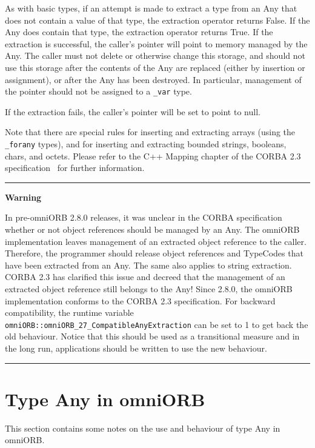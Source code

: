 \documentclass[11pt,twoside,a4paper]{book}
\newcommand{\type}[1]{\texttt{#1}}
\newcommand{\code}[1]{\texttt{#1}}
\newenvironment{statement}%
 {\noindent\begin{minipage}{\textwidth}%
  \vspace{.5\baselineskip}%
  \noindent\rule{\textwidth}{2pt}%
  \vspace{.25\baselineskip}%
  \begin{list}{}{\setlength{\listparindent}{0em}%
                 \setlength{\itemindent}{0em}%
                 \setlength{\leftmargin}{1.5em}%
                 \setlength{\rightmargin}{\leftmargin}%
                 \setlength{\topsep}{0pt}%
                 \setlength{\partopsep}{0pt}}
  \item\relax}
 {\end{list}%
  \vspace{-.25\baselineskip}%
  \noindent\rule{\textwidth}{2pt}%
  \vspace{.5\baselineskip}%
  \end{minipage}}
\begin{document}
As with basic types, if an attempt is made to extract a type from an
Any that does not contain a value of that type, the extraction
operator returns False. If the Any does contain that type, the
extraction operator returns True. If the extraction is successful, the
caller's pointer will point to memory managed by the Any. The caller
must not delete or otherwise change this storage, and should not use
this storage after the contents of the Any are replaced (either by
insertion or assignment), or after the Any has been destroyed. In
particular, management of the pointer should not be assigned to a
\type{\_var} type.

If the extraction fails, the caller's pointer will be set to point to
null.

Note that there are special rules for inserting and extracting arrays
(using the \type{\_forany} types), and for inserting and extracting
bounded strings, booleans, chars, and octets. Please refer to the C++
Mapping chapter of the CORBA 2.3 specification~\cite{corba23-spec} for
further information.


\begin{statement}
\centerline{\textbf{Warning}}

In pre-omniORB 2.8.0 releases, it was unclear in the CORBA
specification whether or not object references should be managed by an
Any.  The omniORB implementation leaves management of an extracted
object reference to the caller. Therefore, the programmer should
release object references and TypeCodes that have been extracted from
an Any. The same also applies to string extraction. CORBA 2.3 has
clarified this issue and decreed that the management of an extracted
object reference still belongs to the Any!  Since 2.8.0, the omniORB
implementation conforms to the CORBA 2.3 specification. For backward
compatibility, the runtime variable
\code{omniORB::omniORB\_27\_CompatibleAnyExtraction} can be set to 1
to get back the old behaviour. Notice that this should be used as a
transitional measure and in the long run, applications should be
written to use the new behaviour.

\end{statement}


\section{Type Any in omniORB}
\label{anyOmniORB}

This section contains some notes on the use and behaviour of type Any
in omniORB.
\end{document}
